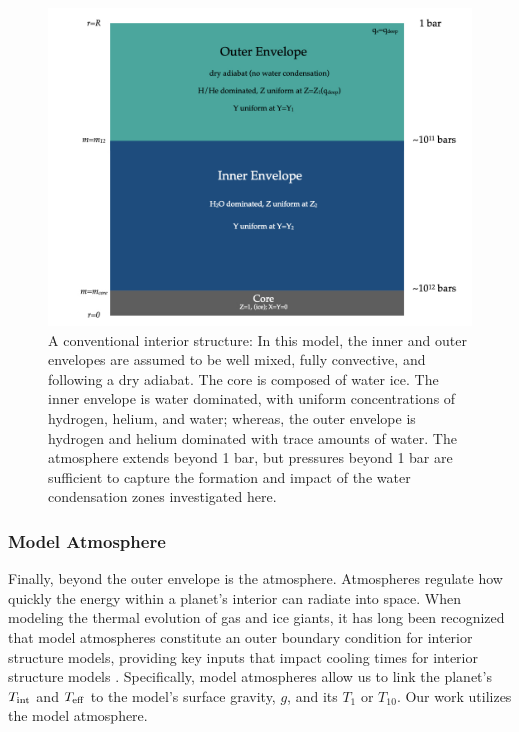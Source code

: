 \documentclass[11pt]{ucscthesisbs}
\begin{document}
\begin{figure}[ht!]
 \centerline{
  \includegraphics[width=6.0in]{figures/structure_schematic/structure_schematic.001.jpeg}
 }
\caption[A Standard Interior Structure Model]
{A conventional interior structure: In this model, the inner and outer envelopes are assumed to be well mixed, fully convective, and following a dry adiabat. The core is composed of water ice. The inner envelope is water dominated, with uniform concentrations of hydrogen, helium, and water; whereas, the outer envelope is hydrogen and helium dominated with trace amounts of water. The atmosphere extends beyond 1 bar, but pressures beyond 1 bar are sufficient to capture the formation and impact of the water condensation zones investigated here.}
\label{fig:standard_dry_interior}
\end{figure}

\subsubsection{Model Atmosphere}
Finally, beyond the outer envelope is the atmosphere. Atmospheres regulate how quickly the energy within a planet's interior can radiate into space. When modeling the thermal evolution of gas and ice giants, it has long been recognized that model atmospheres constitute an outer boundary condition for interior structure models, providing key inputs that impact cooling times for interior structure models \citep{graboske_1975,fortney_2011}. Specifically, model atmospheres allow us to link the planet's $T_{\rm int}$ and $T_{\rm eff}$ to the model's surface gravity, $g$, and its $T_{1}$ or $T_{10}$. Our work utilizes the \citep{fortney_2011} model atmosphere. 
\end{document}
